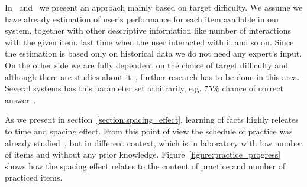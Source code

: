 \documentclass[table,color]{fithesis3/fithesis3}
\begin{document}
In~\cite{papousek2014adaptive} and~\cite{papousek2015impact} we present an
approach mainly based on target difficulty. We assume we have already
estimation of user's performance for each item available in our system,
together with other descriptive information like number of interactions with
the given item, last time when the user interacted with it and so on. Since the
estimation is based only on historical data we do not need any expert's input.
On the other side we are fully dependent on the choice of target difficulty and
although there are studies about it~\cite{lomas2013optimizing,
lomas2014optimizing,jansen2013influence,papousek2015impact}, further research
has to be done in this area. Several systems has this parameter set
arbitrarily, e.g.  75\% chance of correct
answer~\cite{klinkenberg2011computer}.

As we present in section~\ref{section:spacing_effect}, learning of facts highly
releates to time and spacing effect. From this point of view the  schedule of
practice was already studied~\cite{pavlik2008schedule}, but in different
context, which is in laboratory with low number of items and without any prior
knowledge. Figure~\ref{figure:practice_progress} shows how the spacing effect
relates to the content of practice and number of practiced items.
\end{document}
